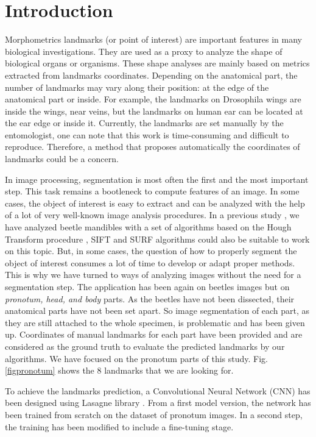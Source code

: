 \documentclass[10pt]{article}
\begin{document}
\section{Introduction}
Morphometrics landmarks (or point of interest) are important features
in many biological investigations. They are used as a proxy to analyze
the shape of biological organs or organisms. These shape analyses are mainly
based on metrics extracted from landmarks coordinates. Depending on the anatomical part, the number of landmarks may vary along their position: at the edge of the anatomical part or inside. For example, the landmarks on Drosophila wings \cite{drosophilaWings} are inside the wings, near veins, but the landmarks on human ear \cite{cintas2016automatic} can be located at
the ear edge or inside it. Currently, the landmarks are set manually by
the entomologist, one can note that this work is time-consuming and difficult to
reproduce. Therefore, a method that proposes automatically the
coordinates of landmarks could be a concern.

In image processing, segmentation is most often the first and the most
important step. This task remains a bootleneck to compute features of
an image. In some cases, the object of interest is easy to extract and
can be analyzed with the help of a lot of very well-known image
analysis procedures. In a previous study \cite{le2017maelab}, we have analyzed beetle
mandibles with a set of algorithms based on the Hough Transform
procedure \cite{palaniswamy2010automatic}, SIFT
\cite{lowe2004distinctive} and SURF \cite{bay2006surf} algorithms could also be
suitable to work on this topic. But, in some cases, the question of how to properly segment the
object of interest consumes a lot of time to develop or adapt proper methods. This is why
we have turned to ways of analyzing images without the need for a segmentation step. The application has been again on beetles images
but on \textit{pronotum, head, and body} parts. As the beetles have not been dissected, their anatomical parts have not been set apart. So image segmentation of each part, as they are still attached to the whole specimen, is problematic and has been given up. Coordinates of manual landmarks for each part
have been provided and are considered as the ground
truth to evaluate the predicted landmarks by our algorithms. We have focused on the
pronotum parts of this study. Fig.\ref{figpronotum} shows
the $8$ landmarks that we are looking for.


To achieve the landmarks prediction, a Convolutional Neural Network
(CNN) \cite{lecun2010convolutional} has been designed using Lasagne
library \cite{lasagne}. From a first model version, the network has been
trained from scratch on the dataset of pronotum images. In a second
step, the training has been modified to include a fine-tuning
\cite{yosinski2014transferable} stage.
\end{document}
